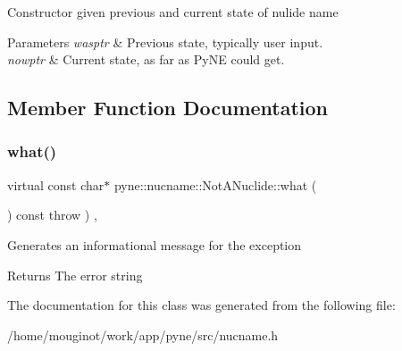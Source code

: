 Constructor given previous and current state of nulide name 
\begin{DoxyParams}{Parameters}
{\em wasptr} & Previous state, typically user input. \\
\hline
{\em nowptr} & Current state, as far as Py\+NE could get. \\
\hline
\end{DoxyParams}


\subsection{Member Function Documentation}
\mbox{\label{classpyne_1_1nucname_1_1_not_a_nuclide_a989e97e1915b17eabeacb12a5dc210aa}} 
\subsubsection{\texorpdfstring{what()}{what()}}
{\footnotesize\ttfamily virtual const char$\ast$ pyne\+::nucname\+::\+Not\+A\+Nuclide\+::what (\begin{DoxyParamCaption}{ }\end{DoxyParamCaption}) const throw  ) \hspace{0.3cm}{\ttfamily [inline]}, {\ttfamily [virtual]}}

Generates an informational message for the exception \begin{DoxyReturn}{Returns}
The error string 
\end{DoxyReturn}


The documentation for this class was generated from the following file\+:\begin{DoxyCompactItemize}
\item 
/home/mouginot/work/app/pyne/src/nucname.\+h\end{DoxyCompactItemize}
